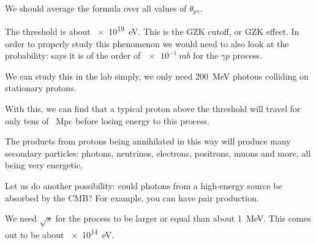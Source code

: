 \documentclass[main.tex]{subfiles}
\begin{document}
We should average the formula over all values of \(\theta_{p \gamma }\). 

The threshold is about \SI{e19}{eV}. 
This is the GZK cutoff, or GZK effect. 
In order to properly study this phenomenon we would need
to also look at the probability: \cite[]{groupReviewParticlePhysics2020} says it is of the order of \(\SI{e-1}{mb}\) for the \(\gamma p\) process. 

We can study this in the lab simply, we only need \SI{200}{MeV} photons colliding on stationary protons. 

With this, we can find that a typical proton above the threshold will travel for only tens of \SI{}{Mpc} before losing energy to this process. 

The products from protons being annihilated in this way will produce many secondary particles: photons, neutrinos, electrons, positrons, muons and more, all being very energetic. 

Let us do another possibility: could photons from a high-energy source be absorbed by the CMB? 
For example, you can have pair production. 

We need \(\sqrt{s}\) for the process to be larger or equal than about \SI{1}{MeV}.
This comes out to be about \SI{e14}{eV}. 
\end{document}
